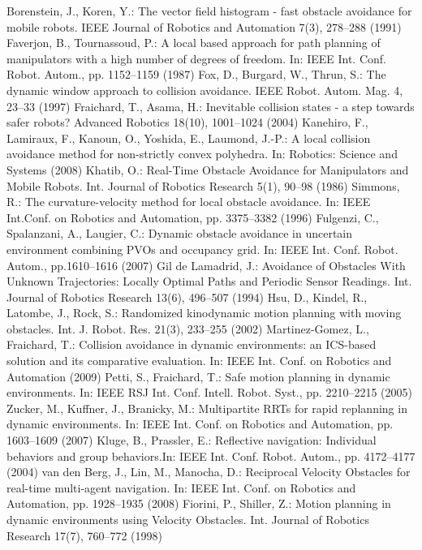 \documentclass[12pt]{report}
\begin{document}
\newpage
{}
\begin{thebibliography}{100}
 Borenstein, J., Koren, Y.: The vector field histogram - fast obstacle avoidance for mobile robots. IEEE Journal of Robotics and Automation 7(3), 278–288 (1991)
 Faverjon, B., Tournassoud, P.: A local based approach for path planning of manipulators with a high number of degrees of freedom. In: IEEE Int. Conf. Robot. Autom., pp. 1152–1159 (1987)
 Fox, D., Burgard, W., Thrun, S.: The dynamic window approach to collision avoidance. IEEE Robot. Autom. Mag. 4, 23–33 (1997)
 Fraichard, T., Asama, H.: Inevitable collision states - a step towards safer robots? Advanced Robotics 18(10), 1001–1024 (2004)
 Kanehiro, F., Lamiraux, F., Kanoun, O., Yoshida, E., Laumond, J.-P.: A local collision avoidance method for non-strictly convex polyhedra. In: Robotics: Science and Systems (2008)
 Khatib, O.: Real-Time Obstacle Avoidance for Manipulators and Mobile Robots. Int. Journal of Robotics Research 5(1), 90–98 (1986)
 Simmons, R.: The curvature-velocity method for local obstacle avoidance. In: IEEE Int.Conf. on Robotics and Automation, pp. 3375–3382 (1996)
 Fulgenzi, C., Spalanzani, A., Laugier, C.: Dynamic obstacle avoidance in uncertain environment combining PVOs and occupancy grid. In: IEEE Int. Conf. Robot. Autom., pp.1610–1616 (2007)
 Gil de Lamadrid, J.: Avoidance of Obstacles With Unknown Trajectories: Locally Optimal Paths and Periodic Sensor Readings. Int. Journal of Robotics Research 13(6), 496–507 (1994)
 Hsu, D., Kindel, R., Latombe, J., Rock, S.: Randomized kinodynamic motion planning with moving obstacles. Int. J. Robot. Res. 21(3), 233–255 (2002)
 Martinez-Gomez, L., Fraichard, T.: Collision avoidance in dynamic environments: an ICS-based solution and its comparative evaluation. In: IEEE Int. Conf. on Robotics and Automation (2009)
 Petti, S., Fraichard, T.: Safe motion planning in dynamic environments. In: IEEE RSJ Int. Conf. Intell. Robot. Syst., pp. 2210–2215 (2005)
 Zucker, M., Kuffner, J., Branicky, M.: Multipartite RRTs for rapid replanning in dynamic environments. In: IEEE Int. Conf. on Robotics and Automation, pp. 1603–1609 (2007)
 Kluge, B., Prassler, E.: Reflective navigation: Individual behaviors and group behaviors.In: IEEE Int. Conf. Robot. Autom., pp. 4172–4177 (2004)
 van den Berg, J., Lin, M., Manocha, D.: Reciprocal Velocity Obstacles for real-time multi-agent navigation. In: IEEE Int. Conf. on Robotics and Automation, pp. 1928–1935 (2008)
 Fiorini, P., Shiller, Z.: Motion planning in dynamic environments using Velocity Obstacles. Int. Journal of Robotics Research 17(7), 760–772 (1998)
\end{thebibliography}
\end{document}
